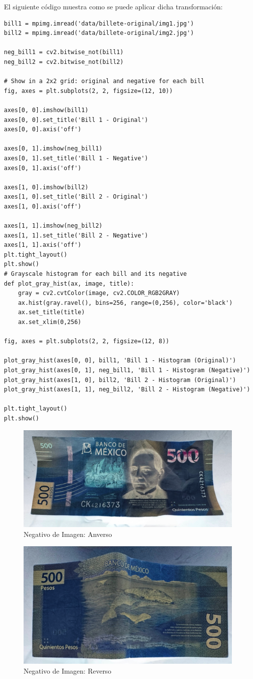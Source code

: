 \documentclass[12pt,letterpaper]{article}
\begin{document}
El siguiente código muestra como se puede aplicar dicha transformación:

\begin{verbatim}
bill1 = mpimg.imread('data/billete-original/img1.jpg')
bill2 = mpimg.imread('data/billete-original/img2.jpg')

neg_bill1 = cv2.bitwise_not(bill1)
neg_bill2 = cv2.bitwise_not(bill2)

# Show in a 2x2 grid: original and negative for each bill
fig, axes = plt.subplots(2, 2, figsize=(12, 10))

axes[0, 0].imshow(bill1)
axes[0, 0].set_title('Bill 1 - Original')
axes[0, 0].axis('off')

axes[0, 1].imshow(neg_bill1)
axes[0, 1].set_title('Bill 1 - Negative')
axes[0, 1].axis('off')

axes[1, 0].imshow(bill2)
axes[1, 0].set_title('Bill 2 - Original')
axes[1, 0].axis('off')

axes[1, 1].imshow(neg_bill2)
axes[1, 1].set_title('Bill 2 - Negative')
axes[1, 1].axis('off')
plt.tight_layout()
plt.show()
# Grayscale histogram for each bill and its negative
def plot_gray_hist(ax, image, title):
    gray = cv2.cvtColor(image, cv2.COLOR_RGB2GRAY)
    ax.hist(gray.ravel(), bins=256, range=(0,256), color='black')
    ax.set_title(title)
    ax.set_xlim(0,256)

fig, axes = plt.subplots(2, 2, figsize=(12, 8))

plot_gray_hist(axes[0, 0], bill1, 'Bill 1 - Histogram (Original)')
plot_gray_hist(axes[0, 1], neg_bill1, 'Bill 1 - Histogram (Negative)')
plot_gray_hist(axes[1, 0], bill2, 'Bill 2 - Histogram (Original)')
plot_gray_hist(axes[1, 1], neg_bill2, 'Bill 2 - Histogram (Negative)')

plt.tight_layout()
plt.show()
\end{verbatim}

\begin{figure}[H]
  \centering
  \includegraphics[width=0.5\linewidth]{figuras/negativo1.png}
  \caption{Negativo de Imagen: Anverso}
  \label{fig:billete_negativo_1}
\end{figure}

\begin{figure}[H]
  \centering
  \includegraphics[width=0.5\linewidth]{figuras/negativo2.png}
  \caption{Negativo de Imagen: Reverso}
  \label{fig:billete_negativo_2}
\end{figure}
\end{document}
